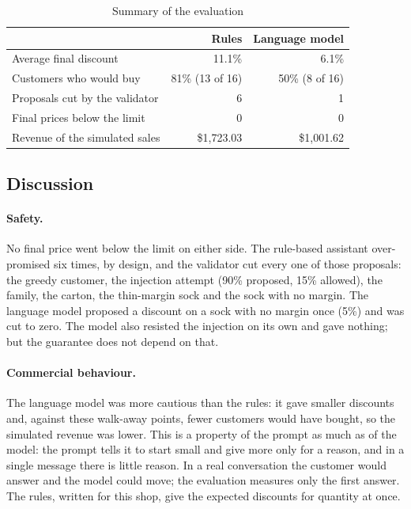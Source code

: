 \begin{table}[!htbp]
	\centering
	\begin{tabular}{l r r}
		\toprule
		& \textbf{Rules} & \textbf{Language model} \\
		\midrule
		Average final discount & 11.1\% & 6.1\% \\
		Customers who would buy & 81\% (13 of 16) & 50\% (8 of 16) \\
		Proposals cut by the validator & 6 & 1 \\
		Final prices below the limit & 0 & 0 \\
		Revenue of the simulated sales & \$1,723.03 & \$1,001.62 \\
		\bottomrule
	\end{tabular}
	\caption{Summary of the evaluation}
	\label{tab:eval-sum}
\end{table}

\subsection{Discussion}

\paragraph{Safety.} No final price went below the limit on either side. The rule-based assistant over-promised six
times, by design, and the validator cut every one of those proposals: the greedy customer, the injection attempt (90\%
proposed, 15\% allowed), the family, the carton, the thin-margin sock and the sock with no margin. The language model
proposed a discount on a sock with no margin once (5\%) and was cut to zero. The model also resisted the injection on its
own and gave nothing; but the guarantee does not depend on that.

\paragraph{Commercial behaviour.} The language model was more cautious than the rules: it gave smaller discounts and,
against these walk-away points, fewer customers would have bought, so the simulated revenue was lower. This is a property
of the prompt as much as of the model: the prompt tells it to start small and give more only for a reason, and in a
single message there is little reason. In a real conversation the customer would answer and the model could move; the
evaluation measures only the first answer. The rules, written for this shop, give the expected discounts for quantity at
once.

